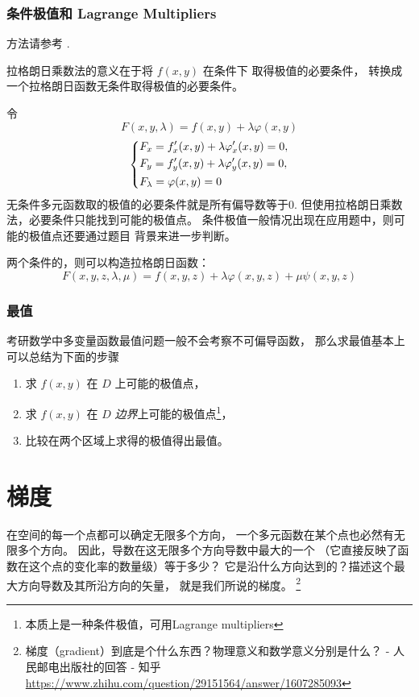 \subsubsection{条件极值和 Lagrange Multipliers}
\label{conditional-extrema-and-lagrange-multipliers}

方法请参考 \cite[page 174, pdf 185]{we}.

拉格朗日乘数法的意义在于将 $f(x, y)$ 在条件下
取得极值的必要条件，
转换成一个拉格朗日函数无条件取得极值的必要条件。

令
\[
    F(x, y, \lambda) = f(x, y) + \lambda \varphi(x, y)
\]
\[
    \begin{dcases*}
        F_x = f'_x(x, y) + \lambda \varphi'_x(x, y) = 0, \\
        F_y = f'_y(x, y) + \lambda \varphi'_y(x, y) = 0, \\
        F_\lambda = \varphi(x, y) = 0
    \end{dcases*}
\]
无条件多元函数取的极值的必要条件就是所有偏导数等于0.
但使用拉格朗日乘数法，必要条件只能找到可能的极值点。
条件极值一般情况出现在应用题中，则可能的极值点还要通过题目
背景来进一步判断。

两个条件的，则可以构造拉格朗日函数：
\[
    F(x, y, z, \lambda, \mu) = f(x, y, z) + \lambda \varphi(x, y, z) + \mu \psi(x, y, z)
\]

\subsubsection{最值}

考研数学中多变量函数最值问题一般不会考察不可偏导函数，
那么求最值基本上可以总结为下面的步骤
\begin{enumerate}
    \item 求 $f(x, y)$ 在 $D$ 上可能的极值点，
    \item 求 $f(x, y)$ 在 $D$ \emph{边界}上可能的极值点\footnote{本质上是一种条件极值，可用Lagrange multipliers}，
    \item 比较在两个区域上求得的极值得出最值。
\end{enumerate}

\section{梯度}\label{gradient}

在空间的每一个点都可以确定无限多个方向，
一个多元函数在某个点也必然有无限多个方向。
因此，导数在这无限多个方向导数中最大的一个
（它直接反映了函数在这个点的变化率的数量级）等于多少？
它是沿什么方向达到的？描述这个最大方向导数及其所沿方向的矢量，
就是我们所说的梯度。
\footnote{
    梯度（gradient）到底是个什么东西？物理意义和数学意义分别是什么？ 
    - 人民邮电出版社的回答 - 知乎
    \url{https://www.zhihu.com/question/29151564/answer/1607285093}
}

